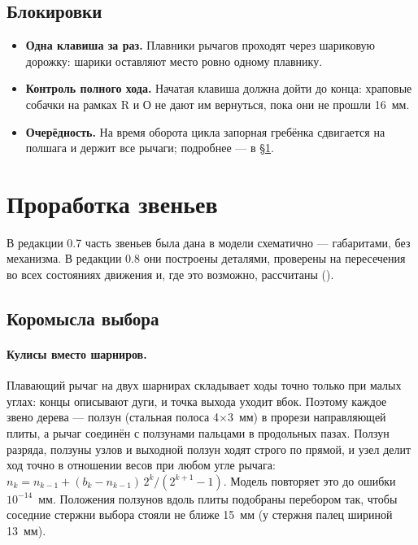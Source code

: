 \subsection{Блокировки}

\begin{itemize}
  \item \textbf{Одна клавиша за раз.} Плавники рычагов проходят через шариковую дорожку: шарики оставляют место ровно одному плавнику.
  \item \textbf{Контроль полного хода.} Начатая клавиша должна дойти до конца: храповые собачки на рамках R и О не дают им вернуться, пока они не прошли 16~мм.
  \item \textbf{Очерёдность.} На время оборота цикла запорная гребёнка сдвигается на полшага и держит все рычаги; подробнее — в \S\ref{sec:links}.
\end{itemize}

\section{Проработка звеньев}
\label{sec:links}

В редакции 0.7 часть звеньев была дана в модели схематично — габаритами, без механизма. В редакции 0.8 они построены деталями, проверены на пересечения во всех состояниях движения и, где это возможно, рассчитаны ().

\subsection{Коромысла выбора}

\paragraph{Кулисы вместо шарниров.} Плавающий рычаг на двух шарнирах складывает ходы точно только при малых углах: концы описывают дуги, и точка выхода уходит вбок. Поэтому каждое звено дерева — ползун (стальная полоса 4$\times$3~мм) в прорези направляющей плиты, а рычаг соединён с ползунами пальцами в продольных пазах. Ползун разряда, ползуны узлов и выходной ползун ходят строго по прямой, и узел делит ход точно в отношении весов при любом угле рычага: $n_k = n_{k-1} + (b_k - n_{k-1})\,2^k/(2^{k+1}-1)$. Модель повторяет это до ошибки $10^{-14}$~мм. Положения ползунов вдоль плиты подобраны перебором так, чтобы соседние стержни выбора стояли не ближе 15~мм (у стержня палец шириной 13~мм).

